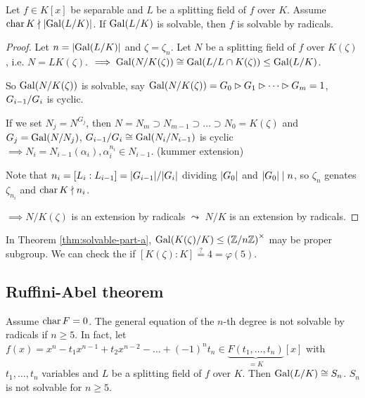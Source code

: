 \begin{theorem}[Part B]
  Let $f \in K[x]$ be separable and $L$ be a splitting field of $f$ over $K$.
  Assume $\operatorname{char} K \nmid \lvert\operatorname{Gal}(L/K)\rvert$. If $\operatorname{Gal}(L/K)$ is solvable, then
  $f$ is solvable by radicals.

  \begin{proof}
    Let $n = \lvert\operatorname{Gal}(L/K)\rvert$ and $\zeta = \zeta_n$.
    Let $N$ be a splitting field of $f$ over $K(\zeta)$, i.e. $N = LK(\zeta)$.
    $\implies \operatorname{Gal}(N/K(\zeta)) \cong \operatorname{Gal}(L/L\cap K(\zeta)) \le \operatorname{Gal}(L/K)$.

    So $\operatorname{Gal}(N/K(\zeta))$ is solvable, say $\operatorname{Gal}(N/K(\zeta)) = G_0 \rhd G_1
    \rhd \dots \rhd G_m = 1$, ${G_{i-1}}/{G_i}$ is cyclic.
    
    If we set $N_j = N^{G_j}$, then
    $N = N_m \supset N_{m-1} \supset \dots \supset N_0 = K(\zeta)$ and
    $G_j = \operatorname{Gal}(N/N_j)$, ${G_{i-1}}/{G_i} \cong \operatorname{Gal}(N_i/N_{i-1})$ is
    cyclic $\implies N_i = N_{i-1}(\alpha_i), \alpha_i^{n_i} \in N_{i-1}$.
    (kummer extension)
    \begin{mdframed}
      Note that $n_i = [L_i : L_{i-1}] = \lvert G_{i-1}\rvert / \lvert G_i\rvert$ dividing
      $\lvert G_0\rvert$ and $\lvert G_0\rvert \mid n$, so $\zeta_n$ genates $\zeta_{n_i}$
      and $\operatorname{char} K \nmid n_i$.
    \end{mdframed}
    $\implies N/K(\zeta)$ is an extension by radicals $\leadsto$
    $N/K$ is an extension by radicals.
  \end{proof}
\end{theorem}

\begin{remark}
  In Theorem \ref{thm:solvable-part-a},
  $\operatorname{Gal}(K(\zeta)/K) \le \left({\mathbb{Z}}/{n\mathbb{Z}}\right)^\times$ may be proper
  subgroup. We can check the if $[K(\zeta) : K] \overset{?}{=} 4 = \varphi(5)$.
\end{remark}

\subsection{Ruffini-Abel theorem}

\begin{theorem}
  Assume $\operatorname{char} F = 0$.
  The general equation of the $n$-th degree is not solvable by radicals if
  $n \ge 5$. In fact, let $f(x) = x^n - t_1x^{n-1} + t_2 x^{n-2} - \dots +
  (-1)^nt_n \in \underbrace{F(t_1, \dots, t_n)}_{=K}[x]$ with
  $t_1, \dots, t_n$ variables and $L$ be a splitting field of $f$ over $K$.
  Then $\operatorname{Gal}(L/K) \cong S_n$. $S_n$ is not solvable for $n \ge 5$.
\end{theorem}

